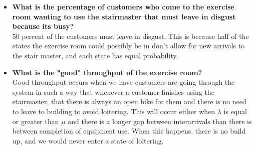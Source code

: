 \documentclass[11pt]{article}
\begin{document}
\begin{enumerate}
\begin{itemize}
		\item \textbf{What is the percentage of customers who come to the exercise room wanting to use the stairmaster that must leave in disgust because its busy?}
		\\50 percent of the customers must leave in disgust. This is because half of the states the exercise room could possibly be in don't allow for new arrivals to the stair master, and each state has equal probability.
		\item \textbf{What is the "good" throughput of the exercise room?}
		\\Good throughput occurs when we have customers are going through the system in such a way that whenever a customer finishes using the stairmaster, that there is always an open bike for them and there is no need to leave to building to avoid loitering. This will occur either when $\lambda$ is equal or greater than $\mu$ and there is a longer gap between interarrivals than there is between completion of equipment use. When this happens, there is no build up, and we would never enter a state of loitering.
		
	\end{itemize}
\end{enumerate}
\end{document}
